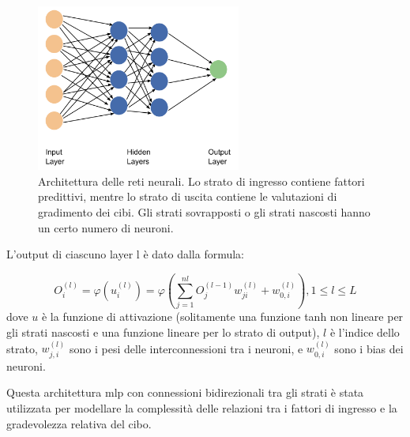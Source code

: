 \begin{figure}[H]
      \centering
      \includegraphics[width=0.6\textwidth]{Chapters/Figures/ArchitectureANN.png}
      \caption{\small Architettura delle reti neurali. Lo strato di ingresso contiene fattori predittivi, mentre lo strato di uscita contiene le valutazioni di gradimento dei cibi. Gli strati sovrapposti o gli strati nascosti hanno un certo numero di neuroni. \cite{alamir2021enhanced}}
      \label{fig:architectureann}
  \end{figure}

  L'output di ciascuno layer l è dato dalla formula:

\begin{equation}
  O_i^{(l)} = \varphi(u_i^{(l)}) = \varphi(\sum_{j=1}^{nl} O_j^{(l-1)} w_{ji}^{(l)} + w_{0,i}^{(l)}), 1 \le l \le L
\end{equation}
  dove $u$ è la funzione di attivazione (solitamente una funzione \gls{tanh} non lineare per gli strati nascosti e una funzione lineare per lo strato di output), $l$ è l'indice dello strato, $w_{j,i}^{(l)}$ sono i pesi delle interconnessioni tra i neuroni, e $w_{0,i}^{(l)}$ sono i bias dei neuroni.

  Questa architettura \gls{mlp} con connessioni bidirezionali tra gli strati è stata utilizzata per modellare la complessità delle relazioni tra i fattori di ingresso e la gradevolezza relativa del cibo.

